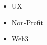 

\begin{itemize}
 \setlength\itemsep{-0.3em}
 \item UX
 \item Non-Profit
 \item Web3
\end{itemize}

% 
%   
